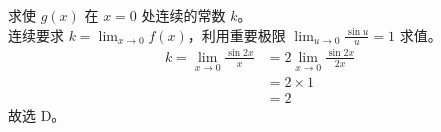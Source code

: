 \begin{solution}
    求使 $g(x)$ 在 $x=0$ 处连续的常数 $k$。\\
    连续要求 $k=\displaystyle\lim_{x\to0}f(x)$，利用重要极限 $\displaystyle\lim_{u\to0}\frac{\sin u}{u}=1$ 求值。\\
    \begin{align*}
        k=\lim_{x\to0}\frac{\sin 2x}{x}
        &=2\lim_{x\to0}\frac{\sin 2x}{2x} \\
        &=2\times 1 \\
        &=2
    \end{align*}
    故选 D。
\end{solution}
